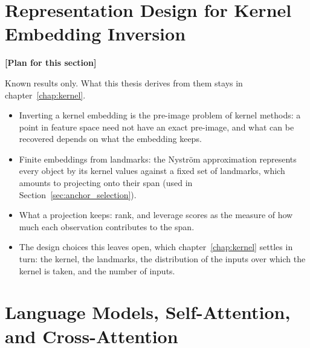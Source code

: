 \documentclass[titlepage,a4paper,11pt]{report}
\newenvironment{RSplan}{\par\medskip\color{orange!85!black}\noindent\textbf{[Plan for this section]}\par}{\par\medskip}
\begin{document}
    \section{Representation Design for Kernel Embedding Inversion}\label{sec:representation_design}
    \begin{RSplan}
    Known results only. What this thesis derives from them stays in chapter~\ref{chap:kernel}.
    \begin{itemize}
        \item Inverting a kernel embedding is the pre-image problem of kernel methods: a point in feature space need not have an exact pre-image, and what can be recovered depends on what the embedding keeps.
        \item Finite embeddings from landmarks: the Nyström approximation represents every object by its kernel values against a fixed set of landmarks, which amounts to projecting onto their span (used in Section~\ref{sec:anchor_selection}).
        \item What a projection keeps: rank, and leverage scores as the measure of how much each observation contributes to the span.
        \item The design choices this leaves open, which chapter~\ref{chap:kernel} settles in turn: the kernel, the landmarks, the distribution of the inputs over which the kernel is taken, and the number of inputs.
    \end{itemize}
    \end{RSplan}

    \section{Language Models, Self-Attention, and Cross-Attention}
    
\end{document}
